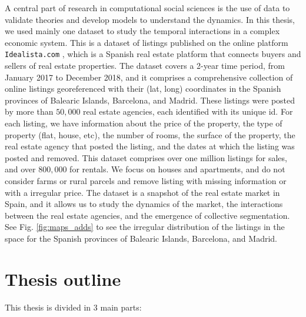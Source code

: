 A central part of research in computational social sciences is the use of data to validate theories and develop models to understand the dynamics. In this thesis, we used mainly one dataset to study the temporal interactions in a complex economic system. This is a dataset of listings published on the online platform \texttt{Idealista.com} \cite{idealista}, which is a Spanish real estate platform that connects buyers and sellers of real estate properties. The dataset covers a 2-year time period, from January 2017 to December 2018, and it comprises a comprehensive collection of online listings georeferenced with their (lat, long) coordinates in the Spanish provinces of Balearic Islands, Barcelona, and Madrid. These listings were posted by more than $50,000$ real estate agencies, each identified with its unique id. For each listing, we have information about the price of the property, the type of property (flat, house, etc), the number of rooms, the surface of the property, the real estate agency that posted the listing, and the dates at which the listing was posted and removed. This dataset comprises over one million listings for sales, and over $800,000$ for rentals. We focus on houses and apartments, and do not consider farms or rural parcels and remove listing with missing information or with a irregular price. The dataset is a snapshot of the real estate market in Spain, and it allows us to study the dynamics of the market, the interactions between the real estate agencies, and the emergence of collective segmentation. See Fig. \ref{fig:maps_adds} to see the irregular distribution of the listings in the space for the Spanish provinces of Balearic Islands, Barcelona, and Madrid.

\section{\label{sec:Thesis outline} Thesis outline}

This thesis is divided in 3 main parts:

